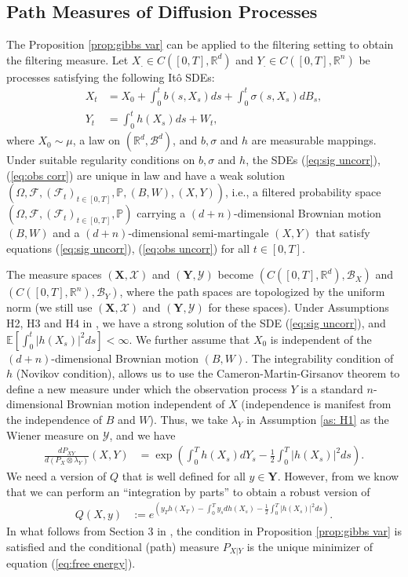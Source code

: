 \documentclass[12pt]{amsart}
\theoremstyle{definition}
\theoremstyle{remark}
\newcommand{\ms}[1]{(\mathbf{#1},\mathcal{#1})}
\begin{document}
\subsection{Path Measures of Diffusion Processes}

The Proposition \ref{prop:gibbs var} can be applied to the filtering setting to obtain the filtering measure. Let $X_.\in C([0,T],\mathbb{R}^d)$ and $Y_.\in C([0,T],\mathbb{R}^n)$ be processes satisfying the following It\^o SDEs:
\begin{align}\label{eq:sig uncorr}
    X_t &= X_0 + \int_0^tb(s,X_s)ds + \int_0^t\sigma(s,X_s)dB_s,\\
    \label{eq:obs uncorr}
    Y_t &= \int_0^th(X_s)ds + W_t,
\end{align}
where $X_0\sim \mu$, a law on $(\mathbb{R}^d,\mathcal{B}^d)$, and $b,\sigma$ and $h$ are measurable mappings. Under suitable regularity conditions on $b,\sigma$ and $h$, the SDEs (\ref{eq:sig uncorr}), (\ref{eq:obs corr}) are unique in law and have a weak solution $(\Omega,\mathcal{F},(\mathcal{F}_t)_{t\in[0,T]},\mathbb{P},(B,W),(X,Y))$, i.e., a filtered probability space $(\Omega,\mathcal{F},(\mathcal{F}_t)_{t\in[0,T]},\mathbb{P})$ carrying a $(d+n)$-dimensional Brownian motion $(B,W)$ and a $(d+n)$-dimensional semi-martingale $(X,Y)$ that satisfy equations (\ref{eq:sig uncorr}), (\ref{eq:obs uncorr}) for all $t\in[0,T]$.

The measure spaces $\ms{X}$ and $\ms{Y}$ become $(C([0,T],\mathbb{R}^d),\mathcal{B}_X)$ and $(C([0,T],\mathbb{R}^n),\mathcal{B}_Y)$, where the path spaces are topologized by the uniform norm (we still use $\ms{X}$ and $\ms{Y}$ for these spaces). Under Assumptions H2, H3 and H4 in \cite{mitter2003variational}, we have a strong solution of the SDE (\ref{eq:sig uncorr}), and $\mathbb{E}[\int_0^t |h(X_s)|^2ds]<\infty$. We further assume that $X_0$ is independent of the $(d+n)$-dimensional Brownian motion $(B,W)$. The integrability condition of $h$ (Novikov condition), allows us to use the Cameron-Martin-Girsanov theorem to define a new measure under which the observation process $Y$ is a standard $n$-dimensional Brownian motion independent of $X$ (independence is manifest from the independence of $B$ and $W$). Thus, we take $\lambda_Y$ in Assumption \ref{as: H1} as the Wiener measure on $\mathcal{Y}$, and we have
\begin{align}
    \frac{dP_{XY}}{d(P_X\otimes\lambda_Y)}(X,Y) &= \exp\left(\int_0^Th(X_s)dY_s-\frac{1}{2}\int_0^T|h(X_s)|^2ds\right).
\end{align}
We need a version of $Q$ that is well defined for all $y\in \mathbf{Y}$. However, from \cite{clark2005robust} we know that we can perform an ``integration by parts'' to obtain a robust version of
\begin{align}
     Q(X,y) &:= e^{\left(y_Th(X_T)-\int_0^Ty_sdh(X_s)-\frac{1}{2}\int_0^T|h(X_s)|^2ds\right)}.
\end{align}
In what follows from Section 3 in \cite{mitter2003variational}, the condition in Proposition \ref{prop:gibbs var} is satisfied and the conditional (path) measure $P_{X|Y}$ is the unique minimizer of equation (\ref{eq:free energy}).
\end{document}
